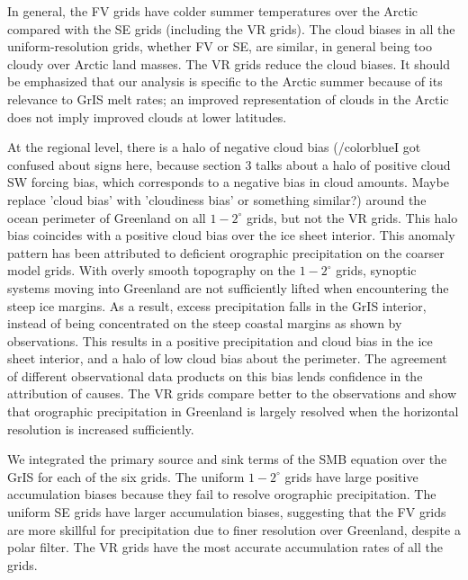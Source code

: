\documentclass[draft]{agujournal2019}
\begin{document}
In general, the FV grids have colder summer temperatures over the Arctic compared with the SE grids (including the VR grids). The cloud biases in all the uniform-resolution grids, whether FV or SE, are similar, in general being too cloudy over Arctic land masses.{\color{purple}{Marcus - hard to parse this sentence.}} The VR grids reduce the cloud biases. It should be emphasized that our analysis is specific to the Arctic summer because of its relevance to GrIS melt rates; an improved representation of clouds in the Arctic does not imply improved clouds at lower latitudes.

At the regional level, there is a halo of negative cloud bias (/color{blue}{I got confused about signs here, because section 3 talks about a halo of positive cloud SW forcing bias, which corresponds to a negative bias in cloud amounts.  Maybe replace 'cloud bias' with 'cloudiness bias' or something similar?}) around the ocean perimeter of Greenland on all $1-2^{\circ}$ grids, but not the VR grids. This halo bias coincides with a positive cloud bias over the ice sheet interior. This anomaly pattern has been attributed to deficient orographic precipitation on the coarser model grids.  With overly smooth topography on the $1-2^{\circ}$ grids, synoptic systems moving into Greenland are not sufficiently lifted when encountering the steep ice margins.
As a result, excess precipitation falls in the GrIS interior, instead of being concentrated on the steep coastal margins as shown by observations. This results in a positive precipitation and cloud bias in the ice sheet interior, and a halo of low cloud bias about the perimeter. The agreement of different observational data products on this bias lends confidence in the attribution of causes.
The VR grids compare better to the observations and show that orographic precipitation in Greenland is largely resolved when the horizontal resolution is increased sufficiently.

We integrated the primary source and sink terms of the SMB equation over the GrIS for each of the six grids. The uniform $1-2^{\circ}$ grids have large positive accumulation biases because they fail to resolve orographic precipitation. The uniform SE grids have larger accumulation biases, suggesting that the FV grids are more skillful for precipitation due to finer resolution over Greenland, despite a polar filter. The VR grids have the most accurate accumulation rates of all the grids. 
\end{document}
